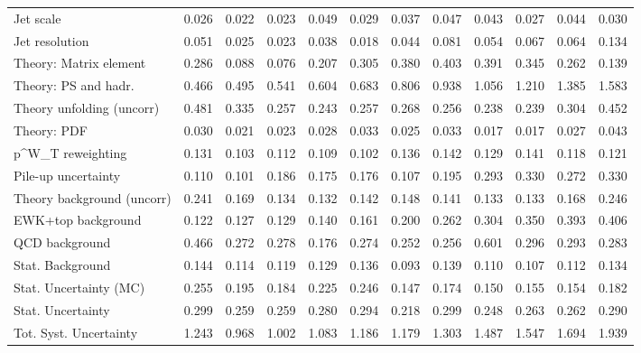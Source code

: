 \begin{tabular}{l|p{0.6cm}p{0.6cm}p{0.6cm}p{0.6cm}p{0.6cm}p{0.6cm}p{0.6cm}p{0.6cm}p{0.6cm}p{0.6cm}p{0.6cm}}
Jet scale                                & 0.026 & 0.022 & 0.023 & 0.049 & 0.029 & 0.037 & 0.047 & 0.043 & 0.027 & 0.044 & 0.030 \\
Jet resolution                           & 0.051 & 0.025 & 0.023 & 0.038 & 0.018 & 0.044 & 0.081 & 0.054 & 0.067 & 0.064 & 0.134 \\
Theory: Matrix element                   & 0.286 & 0.088 & 0.076 & 0.207 & 0.305 & 0.380 & 0.403 & 0.391 & 0.345 & 0.262 & 0.139 \\
Theory: PS and hadr.                     & 0.466 & 0.495 & 0.541 & 0.604 & 0.683 & 0.806 & 0.938 & 1.056 & 1.210 & 1.385 & 1.583 \\
Theory unfolding (uncorr)                & 0.481 & 0.335 & 0.257 & 0.243 & 0.257 & 0.268 & 0.256 & 0.238 & 0.239 & 0.304 & 0.452 \\
Theory: PDF                              & 0.030 & 0.021 & 0.023 & 0.028 & 0.033 & 0.025 & 0.033 & 0.017 & 0.017 & 0.027 & 0.043 \\
p^{W}_{T} reweighting                    & 0.131 & 0.103 & 0.112 & 0.109 & 0.102 & 0.136 & 0.142 & 0.129 & 0.141 & 0.118 & 0.121 \\
Pile-up uncertainty                      & 0.110 & 0.101 & 0.186 & 0.175 & 0.176 & 0.107 & 0.195 & 0.293 & 0.330 & 0.272 & 0.330 \\
Theory background (uncorr)               & 0.241 & 0.169 & 0.134 & 0.132 & 0.142 & 0.148 & 0.141 & 0.133 & 0.133 & 0.168 & 0.246 \\
EWK+top background                       & 0.122 & 0.127 & 0.129 & 0.140 & 0.161 & 0.200 & 0.262 & 0.304 & 0.350 & 0.393 & 0.406 \\
QCD background                           & 0.466 & 0.272 & 0.278 & 0.176 & 0.274 & 0.252 & 0.256 & 0.601 & 0.296 & 0.293 & 0.283 \\
Stat. Background                         & 0.144 & 0.114 & 0.119 & 0.129 & 0.136 & 0.093 & 0.139 & 0.110 & 0.107 & 0.112 & 0.134 \\
Stat. Uncertainty (MC)                   & 0.255 & 0.195 & 0.184 & 0.225 & 0.246 & 0.147 & 0.174 & 0.150 & 0.155 & 0.154 & 0.182 \\
\hline
Stat. Uncertainty                        & 0.299 & 0.259 & 0.259 & 0.280 & 0.294 & 0.218 & 0.299 & 0.248 & 0.263 & 0.262 & 0.290 \\
\hline
Tot. Syst. Uncertainty                   & 1.243 & 0.968 & 1.002 & 1.083 & 1.186 & 1.179 & 1.303 & 1.487 & 1.547 & 1.694 & 1.939 \\
\hline
\end{tabular}
